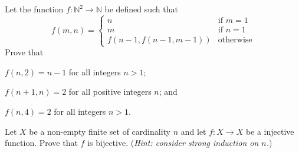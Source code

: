\begin{problem}
    Let the function $f: \mathbb{N}^2 \to \mathbb{N}$ be defined such that
    \[
        f(m, n) =
        \begin{cases}
            n & \text{if } m = 1 \\
            m & \text{if } n = 1 \\
            f\left(n-1,f(n-1,m-1)\right) & \text{otherwise}
        \end{cases}
    \]
    Prove that
    \begin{partquestions}{\roman*}
        \item $f(n,2) = n - 1$ for all integers $n > 1$;
        \item $f(n+1, n) = 2$ for all positive integers $n$; and
        \item $f(n, 4) = 2$ for all integers $n > 1$.
    \end{partquestions}
\end{problem}

\begin{problem}\label{problem-injection-from-finite-set-to-itself-is-bijection}
    Let $X$ be a non-empty finite set of cardinality $n$ and let $f: X \to X$ be a injective function. Prove that $f$ is bijective.\newline
    (\textit{Hint: consider strong induction on $n$.})
\end{problem}
